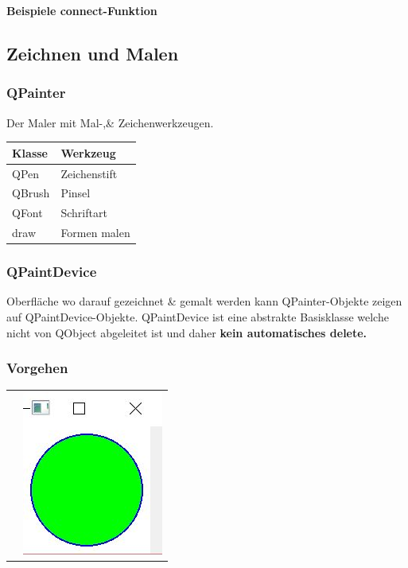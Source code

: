 \vspace{0.5pt}
\textbf{Beispiele connect-Funktion}


\subsection{Zeichnen und Malen}
\begin{multicols}{2}
	\subsubsection{QPainter}
	Der Maler mit Mal-,\& Zeichenwerkzeugen.\\
	
	\begin{tabular}{|l|l|}
		\hline \textbf{Klasse} & \textbf{Werkzeug}\\
		\hline QPen & Zeichenstift\\
		\hline QBrush & Pinsel\\
		\hline QFont & Schriftart\\
		\hline draw & Formen malen\\
		\hline
	\end{tabular}
	
	\subsubsection{QPaintDevice}
	Oberfläche wo darauf gezeichnet \& gemalt werden kann
	QPainter-Objekte zeigen auf QPaintDevice-Objekte. QPaintDevice ist eine abstrakte Basisklasse welche nicht von QObject abgeleitet ist und daher \textbf{kein automatisches delete.}\\

\end{multicols}

\subsubsection{Vorgehen}
\begin{tabular}{c c}
&
\includegraphics{images/qpainter.jpg}
\\
\end{tabular}